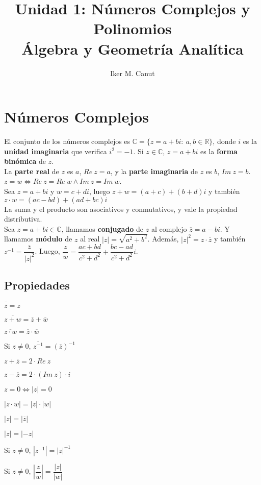 \documentclass[11pt,a4paper]{article}
\author{Iker M. Canut}
\title{Unidad 1: N\'umeros Complejos y Polinomios\\\'Algebra y Geometr\'ia Anal\'itica}
\begin{document}
\maketitle
\newpage
\section{N\'umeros Complejos}
\noindent El conjunto de los n\'umeros complejos es $\mathbb{C} = \{ z = a+bi:\ a,b \in \mathbb{R}\}$, donde $i$ es la \textbf{unidad imaginaria} que verifica $i^2 = -1$. Si $z\in\mathbb{C}$, $z=a+bi$ es la \textbf{forma bin\'omica} de $z$.\\

\noindent La \textbf{parte real} de $z$ es $a$, $Re\ z = a$, y la \textbf{parte imaginaria} de $z$ es $b$, $Im\ z = b$.\\
$z = w \iff Re\ z = Re\ w \land Im\ z = Im\ w$.\\

\noindent Sea $z=a+bi$ y $w=c+di$, luego $z+w = (a+c)+(b+d)i$ y tambi\'en $z \cdot w = (ac-bd)+(ad+bc)i$\\

\noindent La suma y el producto son asociativos y conmutativos, y vale la propiedad distributiva.\\

\noindent Sea $z=a+bi \in \mathbb{C}$, llamamos \textbf{conjugado} de $z$ al complejo $\overline{z}=a-bi$. Y llamamos \textbf{m\'odulo} de $z$ al real $|z| = \sqrt{a^2+b^2}$. Adem\'as, $|z|^2 = z\cdot\overline{z}$ y tambi\'en $z^{-1} = \dfrac{\overline{z}}{|z|^2}$. Luego, $\dfrac{z}{w} = \dfrac{ac+bd}{c^2+d^2} + \dfrac{bc-ad}{c^2+d^2}i$.

\subsection{Propiedades}
\begin{itemize}
\begin{multicols}{3}
\item $\overline{\overline{z}} = z$
\item $\overline{z+w} = \overline{z} + \overline{w}$
\item $\overline{z\cdot w} = \overline{z} \cdot \overline{w}$
\item Si $z \not = 0$, $\overline{z^{-1}} = (\overline{z})^{-1}$
\item $z + \overline{z} = 2\cdot Re\ z$
\item $z - \overline{z} = 2\cdot (Im\ z) \cdot i$
\item $z = 0 \iff |z| = 0$
\item $|z\cdot w| = |z|\cdot|w|$
\item $|z|=|\overline{z}|$
\item $|z|=|-z|$
\item Si $z \not = 0$, $|z^{-1}| = |z|^{-1}$
\item Si $z \not = 0$, $\left|\dfrac{z}{w}\right| = \dfrac{|z|}{|w|}$
\end{multicols}
\end{itemize}
\end{document}
